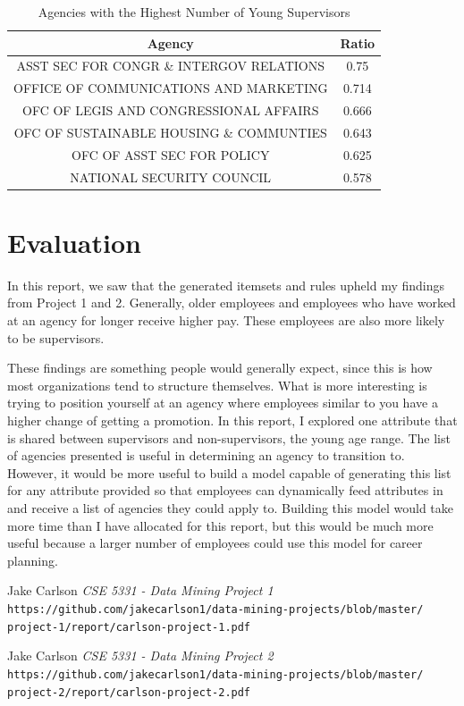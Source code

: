 \documentclass{article}
\begin{document}
    \begin{center}
        \begin{table}
            \centering
            \begin{tabular}{ |c|c| }
                \hline
                Agency & Ratio \\
                \hline
                ASST SEC FOR CONGR \& INTERGOV RELATIONS & 0.75 \\
                OFFICE OF COMMUNICATIONS AND MARKETING & 0.714 \\
                OFC OF LEGIS AND CONGRESSIONAL AFFAIRS & 0.666 \\
                OFC OF SUSTAINABLE HOUSING \& COMMUNTIES & 0.643 \\
                OFC OF ASST SEC FOR POLICY & 0.625 \\
                NATIONAL SECURITY COUNCIL & 0.578 \\
                \hline
            \end{tabular}
            \caption{Agencies with the Highest Number of Young Supervisors}
            \label{tab:9}
        \end{table}
    \end{center}

\section{Evaluation}
In this report, we saw that the generated itemsets and rules upheld my findings from Project 1 and 2. Generally, older employees and employees who have worked at an agency for longer receive higher pay. These employees are also more likely to be supervisors.
\par
These findings are something people would generally expect, since this is how most organizations tend to structure themselves. What is more interesting is trying to position yourself at an agency where employees similar to you have a higher change of getting a promotion. In this report, I explored one attribute that is shared between supervisors and non-supervisors, the young age range. The list of agencies presented is useful in determining an agency to transition to. However, it would be more useful to build a model capable of generating this list for any attribute provided so that employees can dynamically feed attributes in and receive a list of agencies they could apply to. Building this model would take more time than I have allocated for this report, but this would be much more useful because a larger number of employees could use this model for career planning.

\begin{thebibliography}{10}
    Jake Carlson
    \textit{CSE 5331 - Data Mining Project 1}
    \texttt{https://github.com/jakecarlson1/data-mining-projects/blob/master/}
    \texttt{project-1/report/carlson-project-1.pdf}

    Jake Carlson
    \textit{CSE 5331 - Data Mining Project 2}
    \texttt{https://github.com/jakecarlson1/data-mining-projects/blob/master/}
    \texttt{project-2/report/carlson-project-2.pdf}

\end{thebibliography}
\end{document}
